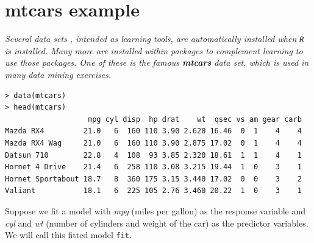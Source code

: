 \documentclass[residuals.tex]{subfiles}
\begin{document}
\Large	
\section{mtcars example} %

\textit{Several data sets , intended as learning tools, are automatically installed when \texttt{R} is installed. Many more are installed within packages to complement learning to use those packages. One of these is the famous \textbf{\textit{mtcars}} data set, which is used in many data mining exercises.}
{
	\large
\begin{framed}
\begin{verbatim}
> data(mtcars)
> head(mtcars)
                   mpg cyl disp  hp drat    wt  qsec vs am gear carb
Mazda RX4         21.0   6  160 110 3.90 2.620 16.46  0  1    4    4
Mazda RX4 Wag     21.0   6  160 110 3.90 2.875 17.02  0  1    4    4
Datsun 710        22.8   4  108  93 3.85 2.320 18.61  1  1    4    1
Hornet 4 Drive    21.4   6  258 110 3.08 3.215 19.44  1  0    3    1
Hornet Sportabout 18.7   8  360 175 3.15 3.440 17.02  0  0    3    2
Valiant           18.1   6  225 105 2.76 3.460 20.22  1  0    3    1

\end{verbatim}
\end{framed}
}

\noindent Suppose we fit a model with \textit{mpg} (miles per gallon) as the response variable and \textit{cyl} and \textit{wt} (number of cylinders and weight of the car)
as the predictor variables. We will call this fitted model \texttt{fit}.
\end{document}

